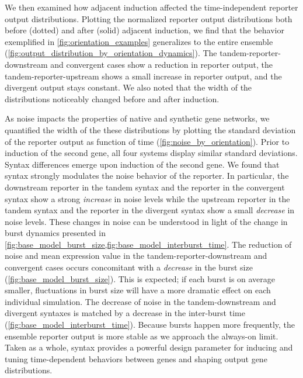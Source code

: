 \documentclass[11pt]{article}
\begin{document}
We then examined how adjacent induction affected the time-independent reporter output distributions. Plotting the normalized reporter output distributions both before (dotted) and after (solid) adjacent induction, we find that the behavior exemplified in \cref{fig:orientation_examples} generalizes to the entire ensemble (\cref{fig:output_distribution_by_orientation_dynamics}). The tandem-reporter-downstream and convergent cases show a reduction in reporter output, the tandem-reporter-upstream shows a small increase in reporter output, and the divergent output stays constant. We also noted that the width of the distributions noticeably changed before and after induction.

As noise impacts the properties of native and synthetic gene networks, we quantified the width of the these distributions by plotting the standard deviation of the reporter output as function of time (\cref{fig:noise_by_orientation}). Prior to induction of the second gene, all four systems display similar standard deviations. Syntax differences emerge upon induction of the second gene. We found that syntax strongly modulates the noise behavior of the reporter. In particular, the downstream reporter in the tandem syntax and the reporter in the convergent syntax show a strong \emph{increase} in noise levels while the upstream reporter in the tandem syntax and the reporter in the divergent syntax show a small \emph{decrease} in noise levels. These changes in noise can be understood in light of the change in burst dynamics presented in \cref{fig:base_model_burst_size,fig:base_model_interburst_time}.
The reduction of noise and mean expression value in the tandem-reporter-downstream and convergent cases occurs concomitant with a \emph{decrease} in the burst size (\cref{fig:base_model_burst_size}). This is expected; if each burst is on average smaller, fluctuations in burst size will have a more dramatic effect on each individual simulation. The decrease of noise in the tandem-downstream and divergent syntaxes is matched by a decrease in the inter-burst time (\cref{fig:base_model_interburst_time}). Because bursts happen more frequently, the ensemble reporter output is more stable as we approach the always-on limit.
Taken as a whole, syntax provides a powerful design parameter for inducing and tuning time-dependent behaviors between genes and shaping output gene distributions.
\end{document}
